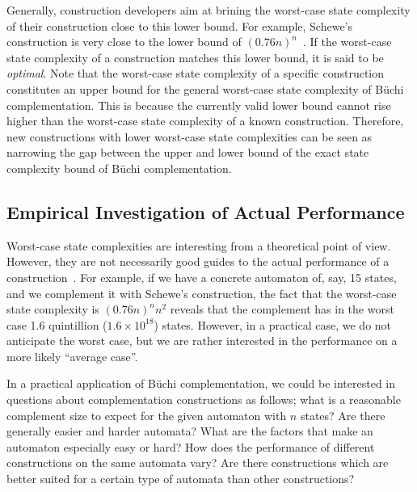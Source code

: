 Generally, construction developers aim at brining the worst-case state complexity of their construction close to this lower bound. For example, Schewe's construction is very close to the lower bound of $(0.76n)^n$~\cite{schewe2009buchi}. If the worst-case state complexity of a construction matches this lower bound, it is said to be \textit{optimal}. Note that the worst-case state complexity of a specific construction constitutes an upper bound for the general worst-case state complexity of Büchi complementation. This is because the currently valid lower bound cannot rise higher than the worst-case state complexity of a known construction. Therefore, new constructions with lower worst-case state complexities can be seen as narrowing the gap between the upper and lower bound of the exact state complexity bound of Büchi complementation.

\subsection{Empirical Investigation of Actual Performance}
\label{1_empirical}
Worst-case state complexities are interesting from a theoretical point of view. However, they are not necessarily good guides to the actual performance of a construction~\cite{2011_tsai}. For example, if we have a concrete automaton of, say, 15 states, and we complement it with Schewe's construction, the fact that the worst-case state complexity is $(0.76n)^n n^2$ reveals that the complement has in the worst case 1.6 quintillion ($1.6 \times 10^{18}$) states. However, in a practical case, we do not anticipate the worst case, but we are rather interested in the performance on a more likely ``average case''.

In a practical application of Büchi complementation, we could be interested in questions about complementation constructions as follows; what is a reasonable complement size to expect for the given automaton with $n$ states? Are there generally easier and harder automata? What are the factors that make an automaton especially easy or hard? How does the performance of different constructions on the same automata vary? Are there constructions which are better suited for a certain type of automata than other constructions?


